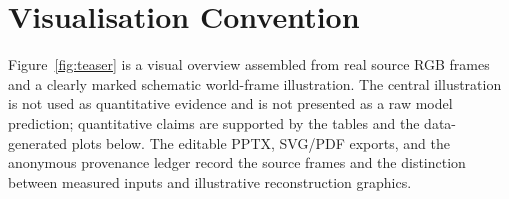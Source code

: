\section{Visualisation Convention}

Figure~\ref{fig:teaser} is a visual overview assembled from real source RGB
frames and a clearly marked schematic world-frame illustration. The central
illustration is not used as quantitative evidence and is not presented as a
raw model prediction; quantitative claims are supported by the tables and
the data-generated plots below. The editable PPTX, SVG/PDF exports, and the
anonymous provenance ledger record the source frames and the distinction
between measured inputs and illustrative reconstruction graphics.

